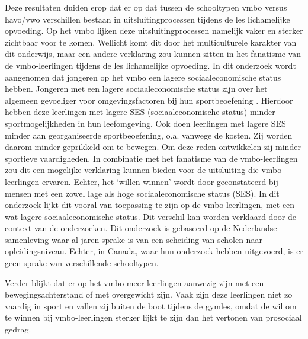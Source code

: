 \documentclass[a4paper,12pt]{memoir}
\begin{document}
Deze resultaten duiden erop dat er op dat tussen de schooltypen vmbo versus havo/vwo verschillen bestaan in uitsluitingprocessen tijdens de les lichamelijke opvoeding. Op het vmbo lijken deze uitsluitingprocessen namelijk vaker en sterker zichtbaar voor te komen. Wellicht komt dit door het multiculturele karakter van dit onderwijs, maar een andere verklaring zou kunnen zitten in het fanatisme van de vmbo-leerlingen tijdens de les lichamelijke opvoeding. In dit onderzoek wordt aangenomen dat jongeren op het vmbo een lagere sociaaleconomische status hebben. Jongeren met een lagere sociaaleconomische status zijn over het algemeen gevoeliger voor omgevingsfactoren bij hun sportbeoefening \parencite{humbert}. Hierdoor hebben deze leerlingen met lagere SES (sociaaleconomische status) minder sportmogelijkheden in hun leefomgeving. Ook doen leerlingen met lagere SES minder aan georganiseerde sportbeoefening, o.a. vanwege de kosten. Zij worden daarom minder geprikkeld om te bewegen. Om deze reden ontwikkelen zij minder sportieve vaardigheden. In combinatie met het fanatisme van de vmbo-leerlingen zou dit een mogelijke verklaring kunnen bieden voor de uitsluiting die vmbo-leerlingen ervaren. Echter, het `willen winnen' wordt door \textcite{humbert} geconstateerd bij mensen met een zowel lage als hoge sociaaleconomische status (SES). In dit onderzoek lijkt dit vooral van toepassing te zijn op de vmbo-leerlingen, met een wat lagere sociaaleconomische status. Dit verschil kan worden verklaard door de context van de onderzoeken. Dit onderzoek is gebaseerd op de Nederlandse samenleving waar al jaren sprake is van een scheiding van scholen naar opleidingsniveau. Echter, in Canada, waar \textcite{humbert} hun onderzoek hebben uitgevoerd, is er geen sprake van verschillende schooltypen.

Verder blijkt dat er op het vmbo meer leerlingen aanwezig zijn met een bewegingsachterstand of met overgewicht zijn. Vaak zijn deze leerlingen niet zo vaardig in sport en vallen zij buiten de boot tijdens de gymles, omdat de wil om te winnen bij vmbo-leerlingen sterker lijkt te zijn dan het vertonen van prosociaal gedrag.
\end{document}
